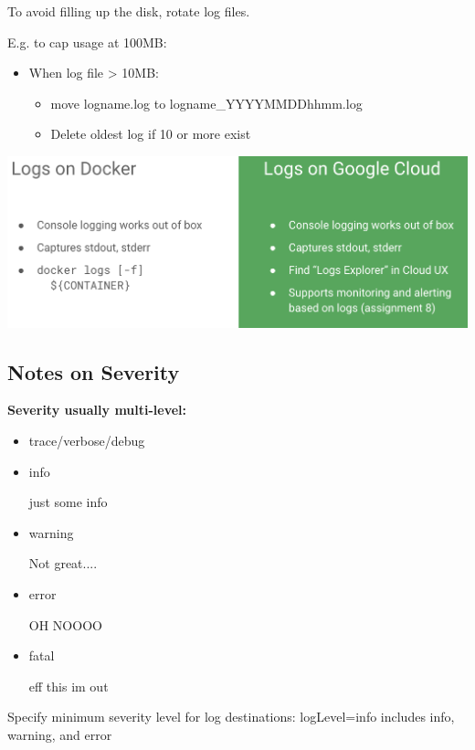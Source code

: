 \documentclass{article}
\begin{document}
To avoid filling up the disk, rotate log files. 

E.g. to cap usage at 100MB:
\begin{itemize}
    \item When log file > 10MB: 
    \begin{itemize}
        \item move logname.log to logname\_YYYYMMDDhhmm.log 
        \item Delete oldest log if 10 or more exist 
    \end{itemize}
\end{itemize}

\includegraphics*[width=\linewidth]{logsDockerCloud.png}

\subsection{Notes on Severity}
\textbf{Severity usually multi-level:}
\begin{itemize}
    \item trace/verbose/debug 
    \item info 
    
    just some info 
    \item warning 

    Not great.... 
    \item error 

    OH NOOOO 
    \item fatal 

    eff this im out
\end{itemize}
Specify minimum severity level for log destinations: logLevel=info includes info, warning, and error 



\pagebreak
\end{document}
